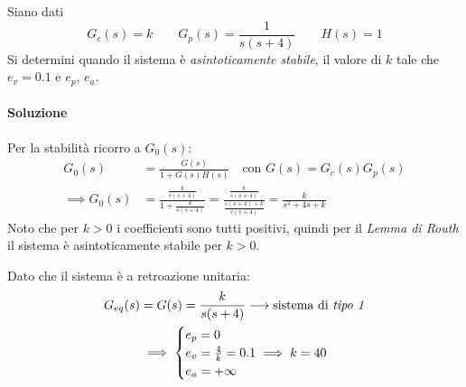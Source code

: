 \begin{esercizio}
Siano dati
\[
	G_c(s) = k \qquad G_p(s) = \frac{1}{s(s+4)} \qquad H(s) = 1
\]
Si determini quando il sistema è \emph{asintoticamente stabile}, il valore di \(k\) tale che \(e_v = 0.1\) e \(e_p\), \(e_a\).

\paragraph{Soluzione}
Per la stabilità ricorro a \(G_0(s)\):
\begin{align*}
	G_0(s) &= \frac{G(s)}{1+G(s)H(s)} \quad \text{con } G(s) = G_c(s)G_p(s) \\
	\implies G_0(s) &= \frac{\frac{k}{s(s+4)}}{1+\frac{k}{s(s+4)}} =
		\frac{\frac{k}{s(s+4)}}{\frac{s(s+4)+k}{s(s+4)}} =
		\frac{k}{s^2+4s+k}
\end{align*}
Noto che per \(k>0\) i coefficienti sono tutti positivi, quindi per il \emph{Lemma di Routh} il sistema è asintoticamente stabile per \(k>0\).

Dato che il sistema è a retroazione unitaria:
\begin{align*}
	G_{eq}(s) &= G(s) = \frac{k}{s(s+4)} \longrightarrow \text{sistema di \emph{tipo 1}} \\
	&\implies \begin{cases}
		e_p = 0 \\
		e_v = \frac{4}{k} = 0.1 \implies k=40 \\
		e_a = +\infty
	\end{cases}
\end{align*}
\end{esercizio}
